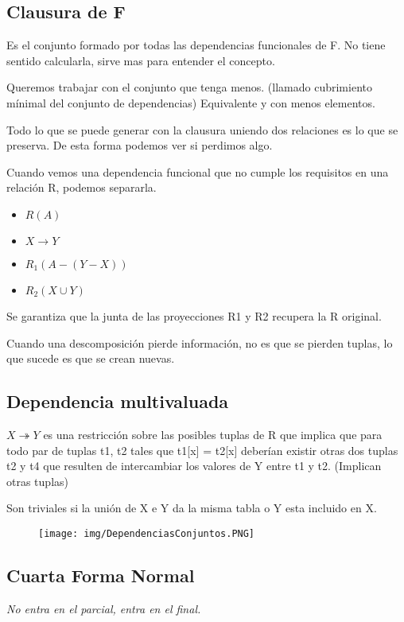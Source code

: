 \subsection*{Clausura de F}
Es el conjunto formado por todas las dependencias funcionales de F. No tiene sentido calcularla, sirve mas para entender el concepto.

Queremos trabajar con el conjunto que tenga menos. (llamado cubrimiento mínimal del conjunto de dependencias) Equivalente y con menos elementos.

Todo lo que se puede generar con la clausura uniendo dos relaciones es lo que se preserva. De esta forma podemos ver si perdimos algo.

Cuando vemos una dependencia funcional que no cumple los requisitos en una relación R, podemos separarla.

\begin{itemize}
\item $R(A)$
\item $X\rightarrow Y$
\item $R_1(A-(Y-X))$
\item $R_2(X \cup Y)$
\end{itemize}
Se garantiza que la junta de las proyecciones R1 y R2 recupera la R original.

Cuando una descomposición pierde información, no es que se pierden tuplas, lo que sucede es que se crean nuevas.


\subsection*{Dependencia multivaluada}
$X\twoheadrightarrow Y$ es una restricción sobre las posibles tuplas de R que implica que para todo par de tuplas t1, t2 tales que t1[x] = t2[x] deberían existir otras dos tuplas t2 y t4 que resulten de intercambiar los valores de Y entre t1 y t2.
(Implican otras tuplas)

Son triviales si la unión de X e Y da la misma tabla o Y esta incluido en X.

\begin{figure}[!htb]
    \centering
    \texttt{[image: img/DependenciasConjuntos.PNG]}
\end{figure}

\subsection*{Cuarta Forma Normal}
\textit{No entra en el parcial, entra en el final.}

